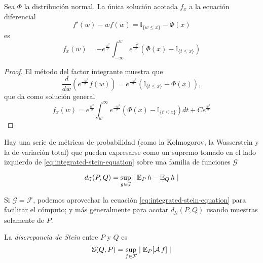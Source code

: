 \documentclass[main.tex]{subfiles}
\begin{document}
\begin{lemma}\label{lemma:stein-eqdif}
    Sea $\Phi$ la distribución normal. La única solución acotada $f_x$ a la ecuación diferencial 
    \begin{equation*}
        f'(w)-wf(w) = \mathbb{I}_{\{w\leq x\}} - \Phi(x)
    \end{equation*}
    es
    \begin{equation*}
        f_x(w) = -e^{\frac{w^2}{2}}\int_{-\infty}^w e^{\frac{-t^2}{2}}\left(\Phi(x)-\mathbb{I}_{\{t\leq x\}}\right)
    \end{equation*}
    \begin{proof}
        El método del factor integrante muestra que
        \begin{equation*}
            \frac{d}{dw}\left(e^\frac{-w^2}{2}f(w)\right) = e^\frac{-w^2}{2}\left(\mathbb{I}_{\{t\leq x\}}-\Phi(x)\right),
        \end{equation*}
        que da como solución general
        \begin{equation*}
            f_x(w) = e^\frac{w^2}{2}\int_w^\infty e^\frac{-w^2}{2}\left(\Phi(x)-\mathbb{I}_{\{t\leq x\}}\right)dt
                + Ce^\frac{w^2}{2}
        \end{equation*}
    \end{proof}
\end{lemma}

Hay una serie de métricas de probabilidad (como la Kolmogorov, la Wasserstein y la de variación total) que pueden expresarse como un supremo tomado en el lado izquierdo de \eqref{eq:integrated-stein-equation} sobre una familia de funciones $\mathcal{G}$ \cite{probability-metrics}

\begin{equation*}
    d_\mathcal{G}(P, Q) = \sup_{g\in\mathcal{G}}\mid \operatorname{\mathbb{E}}_Ph - \operatorname{\mathbb{E}}_Qh \mid
\end{equation*}

Si $\mathcal{G}=\mathcal{F}$, podemos aprovechar la ecuación \eqref{eq:integrated-stein-equation} para facilitar el cómputo; y más generalmente para acotar $d_\mathcal{G}(P, Q)$ usando muestras solamente de $P$.

\begin{definition}
    La \textit{discrepancia de Stein} entre $P$ y $Q$ es
    \begin{equation*}
        \mathbb{S} (Q, P) = \sup_{f\in \mathcal{F}}\mid \operatorname{\mathbb{E}}_P[\operatorname{\mathcal{A}} f] \mid
    \end{equation*}
\end{definition}
\end{document}
